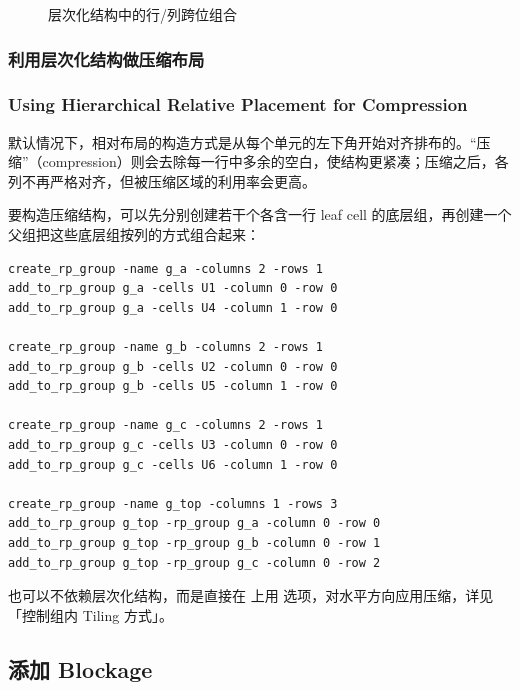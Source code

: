 \begin{figure}[htbp]
\centering
{}
\caption{层次化结构中的行/列跨位组合}
\label{fig:rp-hier-straddle}
\end{figure}

\subsubsection{利用层次化结构做压缩布局}
\subsubsection*{Using Hierarchical Relative Placement for Compression}

默认情况下，相对布局的构造方式是从每个单元的左下角开始对齐排布的。“压缩”（compression）则会去除每一行中多余的空白，使结构更紧凑；压缩之后，各列不再严格对齐，但被压缩区域的利用率会更高。

要构造压缩结构，可以先分别创建若干个各含一行 leaf cell 的底层组，再创建一个父组把这些底层组按列的方式组合起来：
\begin{lstlisting}
create_rp_group -name g_a -columns 2 -rows 1
add_to_rp_group g_a -cells U1 -column 0 -row 0
add_to_rp_group g_a -cells U4 -column 1 -row 0

create_rp_group -name g_b -columns 2 -rows 1
add_to_rp_group g_b -cells U2 -column 0 -row 0
add_to_rp_group g_b -cells U5 -column 1 -row 0

create_rp_group -name g_c -columns 2 -rows 1
add_to_rp_group g_c -cells U3 -column 0 -row 0
add_to_rp_group g_c -cells U6 -column 1 -row 0

create_rp_group -name g_top -columns 1 -rows 3
add_to_rp_group g_top -rp_group g_a -column 0 -row 0
add_to_rp_group g_top -rp_group g_b -column 0 -row 1
add_to_rp_group g_top -rp_group g_c -column 0 -row 2
\end{lstlisting}

也可以不依赖层次化结构，而是直接在  上用  选项，对水平方向应用压缩，详见「控制组内 Tiling 方式」。

\subsection{添加 Blockage}
